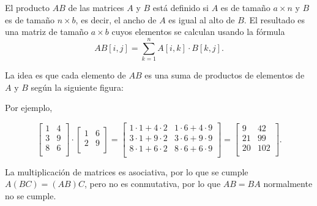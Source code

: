 El producto $AB$ de las matrices $A$ y $B$
está definido si $A$ es de tamaño $a \times n$
y $B$ es de tamaño $n \times b$, es decir,
el ancho de $A$ es igual al alto de $B$.
El resultado es una matriz de tamaño $a \times b$
cuyos elementos se calculan usando la fórmula
\[
AB[i,j] = \sum_{k=1}^n A[i,k] \cdot B[k,j].
\]

La idea es que cada elemento de $AB$
es una suma de productos de elementos de $A$ y $B$
según la siguiente figura:

\begin{center}
\end{center}

Por ejemplo,

\[
 \begin{bmatrix}
  1 & 4 \\
  3 & 9 \\
  8 & 6 \\
 \end{bmatrix}
\cdot
 \begin{bmatrix}
  1 & 6 \\
  2 & 9 \\
 \end{bmatrix}
=
 \begin{bmatrix}
  1 \cdot 1 + 4 \cdot 2 & 1 \cdot 6 + 4 \cdot 9 \\
  3 \cdot 1 + 9 \cdot 2 & 3 \cdot 6 + 9 \cdot 9 \\
  8 \cdot 1 + 6 \cdot 2 & 8 \cdot 6 + 6 \cdot 9 \\
 \end{bmatrix}
=
 \begin{bmatrix}
  9 & 42 \\
  21 & 99 \\
  20 & 102 \\
 \end{bmatrix}.
\]

La multiplicación de matrices es asociativa,
por lo que se cumple $A(BC)=(AB)C$,
pero no es conmutativa,
por lo que $AB = BA$ normalmente no se cumple.

